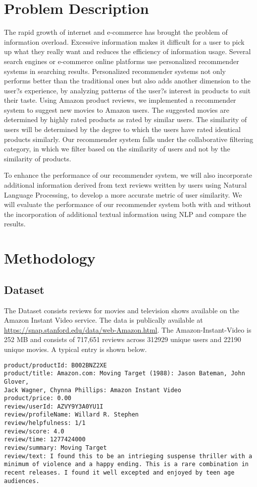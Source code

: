 \documentclass{article} %
\begin{document}
\section{Problem Description}
The rapid growth of internet and e-commerce has brought the problem of information overload. Excessive information makes it difficult for a user to pick up what they really want and reduces the efficiency of information usage. Several search engines or e-commerce online platforms use personalized recommender systems in searching results. Personalized recommender systems not only performs better than the traditional ones but also adds another dimension to the user?s experience, by analyzing patterns of the user?s interest in products to suit their taste. Using Amazon product reviews, we implemented a recommender system to suggest new movies to Amazon users. 
The suggested movies are determined by highly rated products as rated by similar users. The similarity of users will be determined by the degree to which the users have rated identical products similarly. Our recommender system falls under the collaborative filtering category, in which we filter based on the similarity of users and not by the similarity of products.

 To enhance the performance of our recommender system, we will also incorporate additional information derived from text reviews written by users using Natural Language Processing, to develop a more accurate metric of user similarity. We will evaluate the performance of our recommender system both with and without the incorporation of additional textual information using NLP and compare the results.


\section{Methodology}
\subsection{Dataset}
The Dataset consists reviews for movies and television shows available on the Amazon Instant Video service. The data is publically available at \url{https://snap.stanford.edu/data/web-Amazon.html}. The Amazon-Instant-Video is 252 MB and consists of 717,651 reviews across 312929 unique users and 22190 unique movies. A typical entry is shown below. 

\begin{verbatim}
product/productId: B002BNZ2XE
product/title: Amazon.com: Moving Target (1988): Jason Bateman, John Glover, 
Jack Wagner, Chynna Phillips: Amazon Instant Video
product/price: 0.00
review/userId: AZVY9Y3A0YU1I
review/profileName: Willard R. Stephen
review/helpfulness: 1/1
review/score: 4.0
review/time: 1277424000
review/summary: Moving Target
review/text: I found this to be an intrieging suspense thriller with a 
minimum of violence and a happy ending. This is a rare combination in 
recent releases. I found it well excepted and enjoyed by teen age 
audiences.
\end{verbatim}
\end{document}
